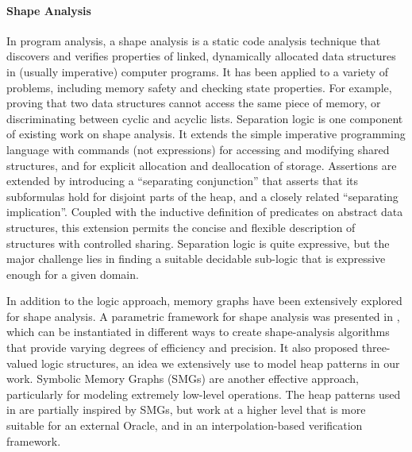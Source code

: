\paragraph{Shape Analysis}
In program analysis, a shape analysis is a static code analysis technique that discovers and verifies properties of linked, dynamically allocated data structures in (usually imperative) computer programs. It has been applied to a variety of problems, including memory safety and checking state properties. For example, proving that two data structures cannot access the same piece of memory, or discriminating between cyclic and acyclic lists. Separation logic \cite{calcagano11,reynolds02} is one component of existing work on shape analysis. It extends the simple imperative programming language with commands (not expressions) for accessing and modifying shared structures, and for explicit allocation and deallocation of storage. Assertions are extended by introducing a ``separating conjunction'' that asserts that its subformulas hold for disjoint parts of the heap, and a closely related ``separating implication''. Coupled with the inductive definition of predicates on abstract data structures, this extension permits the concise and flexible description of
structures with controlled sharing. Separation logic is quite expressive, but the major challenge lies in finding a suitable decidable sub-logic that is expressive enough for a given domain.

In addition to the logic approach, memory graphs have been extensively explored for shape analysis. A parametric framework for shape analysis was presented in \cite{sagiv02}, which can be instantiated in different ways to create shape-analysis algorithms that provide varying degrees of efficiency and precision. It also proposed three-valued logic structures, an idea we extensively use to model heap patterns in our work. Symbolic Memory Graphs (SMGs) \cite{dudka13} are another effective approach, particularly for modeling extremely low-level operations. The heap patterns used in \verifier are partially inspired by SMGs, but work at a higher level that is more suitable for an external Oracle, and in an interpolation-based verification framework.

